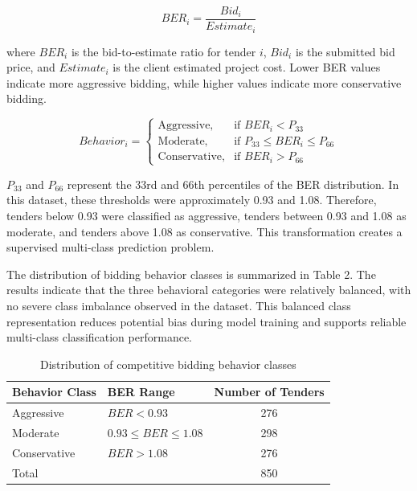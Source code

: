 \documentclass[twoside]{article}
\begin{document}
\begin{equation}
	BER_i = \frac{Bid_i}{Estimate_i}
	\tag{3.1}
\end{equation}

where $BER_i$ is the bid-to-estimate ratio for tender $i$, $Bid_i$ is the submitted bid price, and $Estimate_i$ is the client estimated project cost. Lower BER values indicate more aggressive bidding, while higher values indicate more conservative bidding.

\begin{equation}
	Behavior_i =
	\begin{cases}
		\text{Aggressive}, & \text{if } BER_i < P_{33} \\
		\text{Moderate}, & \text{if } P_{33} \le BER_i \le P_{66} \\
		\text{Conservative}, & \text{if } BER_i > P_{66}
	\end{cases}
	\tag{3.2}
\end{equation}

$P_{33}$ and $P_{66}$ represent the 33rd and 66th percentiles of the BER distribution. In this dataset, these thresholds were approximately 0.93 and 1.08. Therefore, tenders below 0.93 were classified as aggressive, tenders between 0.93 and 1.08 as moderate, and tenders above 1.08 as conservative. This transformation creates a supervised multi-class prediction problem.

The distribution of bidding behavior classes is summarized in Table 2. The results indicate that the three behavioral categories were relatively balanced, with no severe class imbalance observed in the dataset. This balanced class representation reduces potential bias during model training and supports reliable multi-class classification performance.

\begin{table}[ht]
	\centering
	\caption{Distribution of competitive bidding behavior classes}
	\begin{tabular}{llc}
		\hline
		Behavior Class & BER Range & Number of Tenders \\
		\hline
		Aggressive & $BER < 0.93$ & 276 \\
		Moderate & $0.93 \le BER \le 1.08$ & 298 \\
		Conservative & $BER > 1.08$ & 276 \\
		Total &  & 850 \\
		\hline
	\end{tabular}
\end{table}
\end{document}
